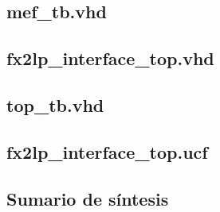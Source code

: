 	\subsection*{mef\_tb.vhd}
		\label{ap:vhdl:meftb}
		
	
	\subsection*{fx2lp\_interface\_top.vhd}
		\label{ap:vhdl:top}
		


	\subsection*{top\_tb.vhd}
		\label{ap:vhdl:toptb}
		
	
	\subsection*{fx2lp\_interface\_top.ucf}
		\label{ap:vhdl:ucf}
		
	\pagebreak	
	\subsection*{Sumario de síntesis}
		\label{ap:vhdl:sum}
		